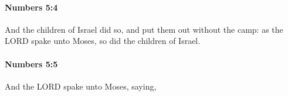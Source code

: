 		\paragraph{Numbers 5:4} %
			\label{NUMBERS-5-4}

			And the children of Israel did so, and put them out without the camp: as the LORD spake unto Moses, so did the children of Israel.


		\paragraph{Numbers 5:5} %
			\label{NUMBERS-5-5}

			And the LORD spake unto Moses, saying,



